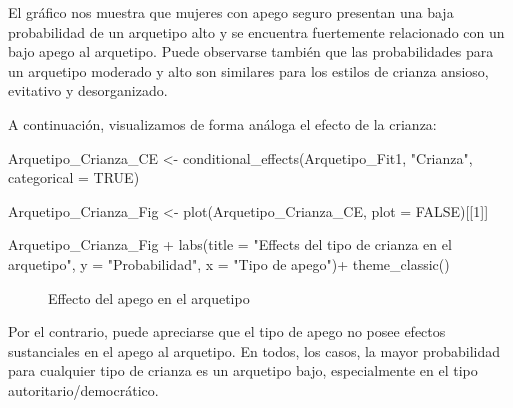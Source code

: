 \documentclass[
  letterpaper,
  DIV=11,
  numbers=noendperiod]{scrartcl}
\newenvironment{Shaded}{\begin{snugshade}}{\end{snugshade}}
\newcommand{\AttributeTok}[1]{\textcolor[rgb]{0.40,0.45,0.13}{#1}}
\newcommand{\ConstantTok}[1]{\textcolor[rgb]{0.56,0.35,0.01}{#1}}
\newcommand{\DecValTok}[1]{\textcolor[rgb]{0.68,0.00,0.00}{#1}}
\newcommand{\FunctionTok}[1]{\textcolor[rgb]{0.28,0.35,0.67}{#1}}
\newcommand{\NormalTok}[1]{\textcolor[rgb]{0.00,0.23,0.31}{#1}}
\newcommand{\OtherTok}[1]{\textcolor[rgb]{0.00,0.23,0.31}{#1}}
\newcommand{\SpecialCharTok}[1]{\textcolor[rgb]{0.37,0.37,0.37}{#1}}
\newcommand{\StringTok}[1]{\textcolor[rgb]{0.13,0.47,0.30}{#1}}
\begin{document}
El gráfico nos muestra que mujeres con apego seguro presentan una baja
probabilidad de un arquetipo alto y se encuentra fuertemente relacionado
con un bajo apego al arquetipo. Puede observarse también que las
probabilidades para un arquetipo moderado y alto son similares para los
estilos de crianza ansioso, evitativo y desorganizado.

A continuación, visualizamos de forma análoga el efecto de la crianza:

\begin{Shaded}
\begin{Highlighting}[]
\NormalTok{Arquetipo\_Crianza\_CE }\OtherTok{\textless{}{-}} \FunctionTok{conditional\_effects}\NormalTok{(Arquetipo\_Fit1, }\StringTok{"Crianza"}\NormalTok{, }\AttributeTok{categorical =} \ConstantTok{TRUE}\NormalTok{) }

\NormalTok{Arquetipo\_Crianza\_Fig }\OtherTok{\textless{}{-}} \FunctionTok{plot}\NormalTok{(Arquetipo\_Crianza\_CE, }\AttributeTok{plot =} \ConstantTok{FALSE}\NormalTok{)[[}\DecValTok{1}\NormalTok{]]}

\NormalTok{Arquetipo\_Crianza\_Fig }\SpecialCharTok{+}
  \FunctionTok{labs}\NormalTok{(}\AttributeTok{title =} \StringTok{"Effects del tipo de crianza en el arquetipo"}\NormalTok{,}
       \AttributeTok{y =} \StringTok{"Probabilidad"}\NormalTok{,}
       \AttributeTok{x =} \StringTok{"Tipo de apego"}\NormalTok{)}\SpecialCharTok{+}
  \FunctionTok{theme\_classic}\NormalTok{()}
\end{Highlighting}
\end{Shaded}

\begin{figure}[H]


\caption{\label{fig-Arquetipo_CE_Crianza}Effecto del apego en el
arquetipo}

\end{figure}%

Por el contrario, puede apreciarse que el tipo de apego no posee efectos
sustanciales en el apego al arquetipo. En todos, los casos, la mayor
probabilidad para cualquier tipo de crianza es un arquetipo bajo,
especialmente en el tipo autoritario/democrático.
\end{document}
